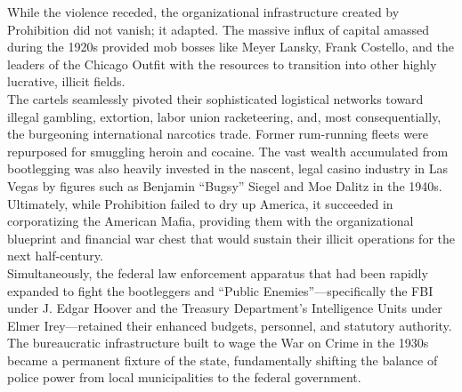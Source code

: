 \documentclass[
]{article}
\begin{document}
While the violence receded, the organizational infrastructure created by
Prohibition did not vanish; it adapted. The massive influx of capital
amassed during the 1920s provided mob bosses like Meyer Lansky, Frank
Costello, and the leaders of the Chicago Outfit with the resources to
transition into other highly lucrative, illicit fields.\\
The cartels seamlessly pivoted their sophisticated logistical networks
toward illegal gambling, extortion, labor union racketeering, and, most
consequentially, the burgeoning international narcotics trade. Former
rum-running fleets were repurposed for smuggling heroin and cocaine. The
vast wealth accumulated from bootlegging was also heavily invested in
the nascent, legal casino industry in Las Vegas by figures such as
Benjamin ``Bugsy'' Siegel and Moe Dalitz in the 1940s. Ultimately, while
Prohibition failed to dry up America, it succeeded in corporatizing the
American Mafia, providing them with the organizational blueprint and
financial war chest that would sustain their illicit operations for the
next half-century.\\
Simultaneously, the federal law enforcement apparatus that had been
rapidly expanded to fight the bootleggers and ``Public
Enemies''---specifically the FBI under J. Edgar Hoover and the Treasury
Department's Intelligence Units under Elmer Irey---retained their
enhanced budgets, personnel, and statutory authority. The bureaucratic
infrastructure built to wage the War on Crime in the 1930s became a
permanent fixture of the state, fundamentally shifting the balance of
police power from local municipalities to the federal government.
\end{document}
